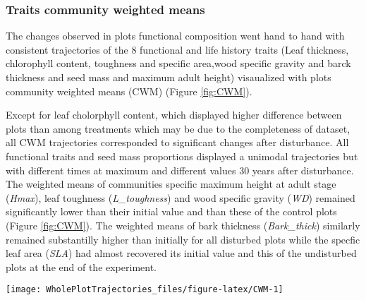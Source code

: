 \documentclass[fleqn,10pt]{ArtEcoFoG} %
\theoremstyle{definition}
\theoremstyle{definition}
\theoremstyle{definition}
\theoremstyle{remark}
\begin{document}
\subsubsection{Traits community weighted
means}\label{traits-community-weighted-means}

The changes observed in plots functional composition went hand to hand
with consistent trajectories of the 8 functional and life history traits
(Leaf thickness, chlorophyll content, toughness and specific area,wood
specific gravity and barck thickness and seed mass and maximum adult
height) visaualized with plots community weighted means (CWM) (Figure
\ref{fig:CWM}).

Except for leaf cholorphyll content, which displayed higher difference
between plots than among treatments which may be due to the completeness
of dataset, all CWM trajectories corresponded to significant changes
after disturbance. All functional traits and seed mass proportions
displayed a unimodal trajectories but with different times at maximum
and different values 30 years after disturbance. The weighted means of
communities specific maximum height at adult stage (\emph{Hmax}), leaf
toughness (\emph{L\_toughness}) and wood specific gravity (\emph{WD})
remained significantly lower than their initial value and than these of
the control plots (Figure \ref{fig:CWM}). The weighted means of bark
thickness (\emph{Bark\_thick}) similarly remained substantilly higher
than initially for all disturbed plots while the specfic leaf area
(\emph{SLA}) had almost recovered its initial value and this of the
undisturbed plots at the end of the experiment.

\begin{figure*}

{\centering \texttt{[image: WholePlotTrajectories\_files/figure-latex/CWM-1]} 

}

\caption{Trajectories of the communities weighted means (CWM) over 30 years after disturbance of 4 leaf traits (Leaf thickness, \emph{L\_thickness}, chlorophyll content, \emph{L\_chloro}, toughness, \emph{L\_toughness} and specific area, \emph{SLA}), 2 stem traits (wood specific gravity, \emph{WD}, and bark thickness, \emph{Bark-thick}) and one life trait (Specific maximum height at adult stage, \emph{Hmax}). Trajectories correspond to the median (solid line) and 0.025 and 0.975 percentile (gray envelope) observed after 50 iteration of the taxonomic uncertainty propagation and the missing trait value filling processes. Initial treatments are represented by solid lines colorswith green for control, blue for T1,orange for T2 and red for T3.}\label{fig:CWM}
\end{figure*}
\end{document}
